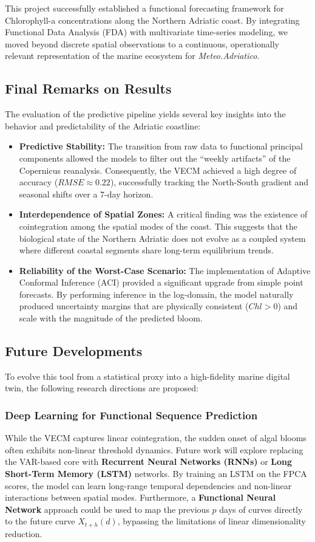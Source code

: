This project successfully established a functional forecasting framework for Chlorophyll-a concentrations along the Northern Adriatic coast. By integrating Functional Data Analysis (FDA) with multivariate time-series modeling, we moved beyond discrete spatial observations to a continuous, operationally relevant representation of the marine ecosystem for \textit{Meteo.Adriatico}.

\subsection{Final Remarks on Results}
The evaluation of the predictive pipeline yields several key insights into the behavior and predictability of the Adriatic coastline:
\begin{itemize}
    \item \textbf{Predictive Stability:} The transition from raw data to functional principal components allowed the models to filter out the ``weekly artifacts'' of the Copernicus reanalysis. Consequently, the VECM achieved a high degree of accuracy ($RMSE \approx 0.22$), successfully tracking the North-South gradient and seasonal shifts over a 7-day horizon.
    \item \textbf{Interdependence of Spatial Zones:} A critical finding was the existence of cointegration among the spatial modes of the coast. This suggests that the biological state of the Northern Adriatic does not evolve as a coupled system where different coastal segments share long-term equilibrium trends.
    \item \textbf{Reliability of the Worst-Case Scenario:} The implementation of Adaptive Conformal Inference (ACI) provided a significant upgrade from simple point forecasts. By performing inference in the log-domain, the model naturally produced uncertainty margins that are physically consistent ($Chl > 0$) and scale with the magnitude of the predicted bloom.
\end{itemize}

\subsection{Future Developments}
To evolve this tool from a statistical proxy into a high-fidelity marine digital twin, the following research directions are proposed:

\subsubsection{Deep Learning for Functional Sequence Prediction}
While the VECM captures linear cointegration, the sudden onset of algal blooms often exhibits non-linear threshold dynamics. Future work will explore replacing the VAR-based core with \textbf{Recurrent Neural Networks (RNNs)} or \textbf{Long Short-Term Memory (LSTM)} networks. By training an LSTM on the FPCA scores, the model can learn long-range temporal dependencies and non-linear interactions between spatial modes. Furthermore, a \textbf{Functional Neural Network} approach could be used to map the previous $p$ days of curves directly to the future curve $X_{t+h}(d)$, bypassing the limitations of linear dimensionality reduction.

